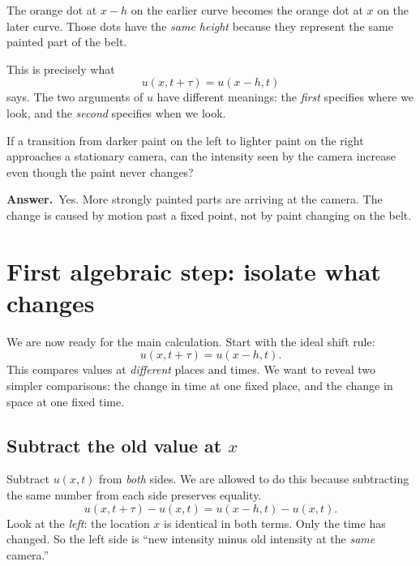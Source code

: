 \documentclass[11pt,a4paper]{article}
\newcommand{\secstart}[1]{\Needspace{7\baselineskip}\section{#1}}
\newcommand{\substart}[1]{\Needspace{5\baselineskip}\subsection{#1}}
\newcommand{\answer}{\par\smallskip\textbf{Answer.}~}
\begin{document}
\begin{center}
\end{center}
The orange dot at $x-h$ on the earlier curve becomes the orange dot at $x$ on the later curve. Those dots have the \emph{same height} because they represent the same painted part of the belt.

This is precisely what
\[
u(x,t+\tau)=u(x-h,t)
\]
says. The two arguments of $u$ have different meanings: the \emph{first} specifies where we look, and the \emph{second} specifies when we look.

\begin{thinkbox}
If a transition from darker paint on the left to lighter paint on the right approaches a stationary camera, can the intensity seen by the camera increase even though the paint never changes?
\answer Yes. More strongly painted parts are arriving at the camera. The change is caused by motion past a fixed point, not by paint changing on the belt.
\end{thinkbox}

\clearpage
\secstart{First algebraic step: isolate what changes}
We are now ready for the main calculation. Start with the ideal shift rule:
\begin{equation*}
u(x,t+\tau)=u(x-h,t).
\end{equation*}
This compares values at \emph{different} places and times. We want to reveal two simpler comparisons: the change in time at one fixed place, and the change in space at one fixed time.

\substart{Subtract the old value at $x$}
Subtract $u(x,t)$ from \emph{both} sides. We are allowed to do this because subtracting the same number from each side preserves equality.
\begin{equation}
\boxed{u(x,t+\tau)-u(x,t)=u(x-h,t)-u(x,t).}\tag{4}
\end{equation}
Look at the \emph{left}: the location $x$ is identical in both terms. Only the time has changed. So the left side is ``new intensity minus old intensity at the \emph{same} camera.''
\end{document}

